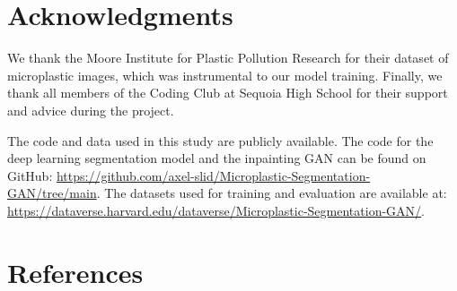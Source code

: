 \documentclass{article}
\begin{document}
\section{Acknowledgments}

We thank the Moore Institute for Plastic Pollution Research for their dataset of microplastic images, which was instrumental to our model training. Finally, we thank all members of the Coding Club at Sequoia High School for their support and advice during the project.

The code and data used in this study are publicly available. The code for the deep learning segmentation model and the inpainting GAN can be found on GitHub: \href{https://github.com/axel-slid/Microplastic-Segmentation-GAN/tree/main}{https://github.com/axel-slid/Microplastic-Segmentation-GAN/tree/main}. The datasets used for training and evaluation are available at: \href{https://dataverse.harvard.edu/dataverse/Microplastic-Segmentation-GAN/}{https://dataverse.harvard.edu/dataverse/Microplastic-Segmentation-GAN/}.

\section*{References}

\medskip
\end{document}
